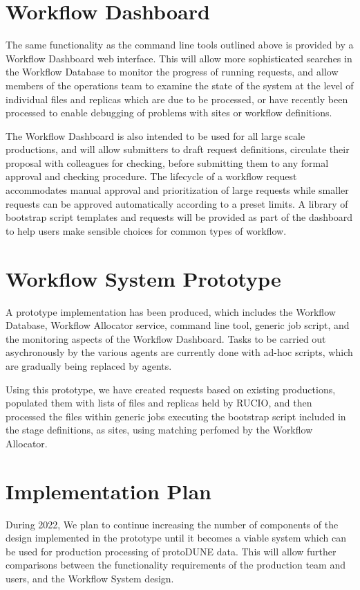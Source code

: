 \documentclass[../main-v1.tex]{subfiles}
\begin{document}
\section{Workflow Dashboard}
\label{sec:flow:dashboard}

The same functionality as the command line tools outlined above is provided by a Workflow Dashboard web interface. This will allow more sophisticated searches in the Workflow Database to monitor the progress of running requests, and allow members of the operations team to examine the state of the system at the level of individual files and replicas which are due to be processed, or have recently been processed to enable debugging of problems with sites or workflow definitions.

The Workflow Dashboard is also intended to be used for all large scale productions, and will allow submitters to draft request definitions, circulate their proposal with colleagues for checking, before submitting them to any formal approval and checking procedure. The lifecycle of a workflow request accommodates manual approval and prioritization of large requests while smaller requests can be approved automatically according to a preset limits. A library of bootstrap script templates and requests will be provided as part of the dashboard to help users make sensible choices for common types of workflow.

\section{Workflow System Prototype}
\label{sec:flow:prototype}

A prototype implementation has been produced, which includes the Workflow Database, Workflow Allocator service, command line tool, generic job script, and the monitoring aspects of the Workflow Dashboard. Tasks to be carried out asychronously by the various agents are currently done with ad-hoc scripts, which are gradually being replaced by agents.

Using this prototype, we have created requests based on existing productions, populated them with lists of files and replicas held by RUCIO, and then processed the files within generic jobs executing the bootstrap script included in the stage definitions, as sites, using matching perfomed by the Workflow Allocator.

\section{Implementation Plan }
\label{sec:flow:implementation}

During 2022, We plan to continue increasing the number of components of the design implemented in the prototype until it becomes a viable system which can be used for production processing of protoDUNE data. This will allow further comparisons between the functionality requirements of the production team and users, and the Workflow System design.

\end{document}
